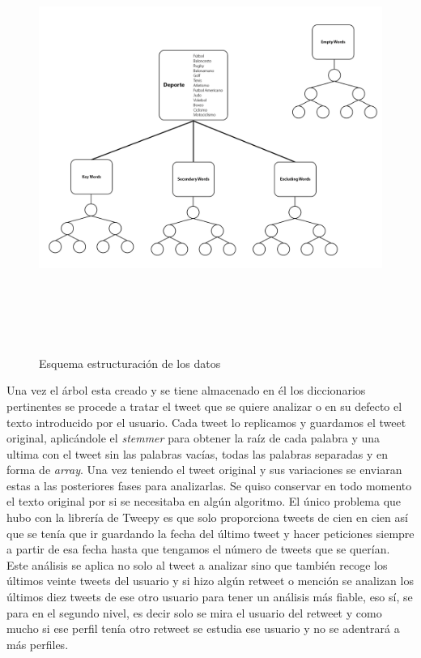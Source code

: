 \documentclass[../all.tex]{subfiles}
\begin{document}
	\begin{figure}[H]
		\centering
		\includegraphics[height=14cm, width=14cm]{imgs/treeScheme.png}
		\caption{Esquema estructuración de los datos}
	\end{figure}

	\newpage
	Una vez el árbol esta creado y se tiene almacenado en él los diccionarios pertinentes se procede a tratar el tweet que se quiere analizar o en su defecto el texto introducido por el usuario.  Cada tweet lo replicamos y guardamos el tweet original, aplicándole el \textit{stemmer} para obtener la raíz de cada palabra y una ultima con el tweet sin las palabras vacías, todas las palabras separadas y en forma de \textit{array}. Una vez teniendo el tweet original y sus variaciones se enviaran estas a las posteriores fases para analizarlas. Se quiso conservar en todo momento el texto original por si se necesitaba en algún algoritmo. El único problema que hubo con la librería de Tweepy es que solo proporciona tweets de cien en cien así que se tenía que ir guardando la fecha del último tweet y hacer peticiones siempre a partir de esa fecha hasta que tengamos el número de tweets que se querían.\\
	
	Este análisis se aplica no solo al tweet a analizar sino que también recoge los últimos veinte tweets del usuario y si hizo algún retweet o mención se analizan los últimos diez tweets de ese otro usuario para tener un análisis más fiable, eso sí, se para en el segundo nivel, es decir solo se mira el usuario del retweet y como mucho si ese perfil tenía otro retweet se estudia ese usuario y no se adentrará a más perfiles.\\
	
\end{document}
